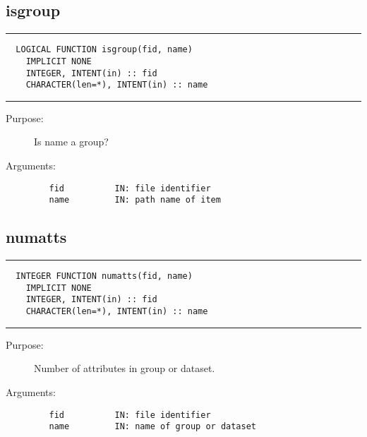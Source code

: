 \documentclass[a4paper]{article}
\begin{document}
\subsection{isgroup}

\par
\addvspace{\medskipamount}
\nopagebreak\hrule
\begin{verbatim}
  LOGICAL FUNCTION isgroup(fid, name)
    IMPLICIT NONE
    INTEGER, INTENT(in) :: fid
    CHARACTER(len=*), INTENT(in) :: name
\end{verbatim}
\nopagebreak\hrule
\addvspace{\medskipamount}

\begin{description}
\item[Purpose:] \mbox{}

Is name a group?

\item[Arguments:] \mbox{}

\begin{verbatim}
   fid          IN: file identifier
   name         IN: path name of item

\end{verbatim}


\end{description}





\subsection{numatts}

\par
\addvspace{\medskipamount}
\nopagebreak\hrule
\begin{verbatim}
  INTEGER FUNCTION numatts(fid, name)
    IMPLICIT NONE
    INTEGER, INTENT(in) :: fid
    CHARACTER(len=*), INTENT(in) :: name
\end{verbatim}
\nopagebreak\hrule
\addvspace{\medskipamount}

\begin{description}
\item[Purpose:] \mbox{}

Number of attributes in group or dataset.

\item[Arguments:] \mbox{}

\begin{verbatim}
   fid          IN: file identifier
   name         IN: name of group or dataset

\end{verbatim}


\end{description}
\end{document}
